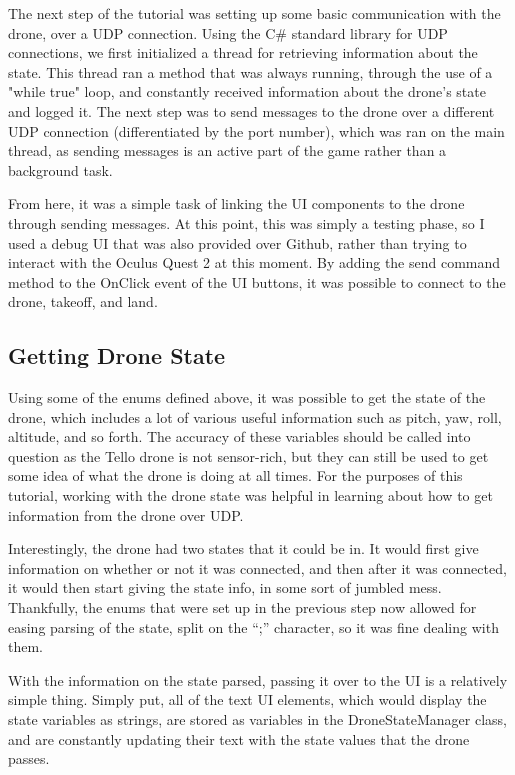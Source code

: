 \documentclass[10pt,twocolumn]{article}
\begin{document}
The next step of the tutorial was setting up some basic communication with the drone, over a UDP connection. Using the C\# standard library for UDP connections, we first initialized a thread for retrieving information about the state. This thread ran a method that was always running, through the use of a "while true" loop, and constantly received information about the drone's state and logged it. The next step was to send messages to the drone over a different UDP connection (differentiated by the port number), which was ran on the main thread, as sending messages is an active part of the game rather than a background task.

From here, it was a simple task of linking the UI components to the drone through sending messages. At this point, this was simply a testing phase, so I used a debug UI that was also provided over Github, rather than trying to interact with the Oculus Quest 2 at this moment. By adding the send command method to the OnClick event of the UI buttons, it was possible to connect to the drone, takeoff, and land.

\subsection{Getting Drone State}
Using some of the enums defined above, it was possible to get the state of the drone, which includes a lot of various useful information such as pitch, yaw, roll, altitude, and so forth. The accuracy of these variables should be called into question as the Tello drone is not sensor-rich, but they can still be used to get some idea of what the drone is doing at all times. For the purposes of this tutorial, working with the drone state was helpful in learning about how to get information from the drone over UDP. 

Interestingly, the drone had two states that it could be in. It would first give information on whether or not it was connected, and then after it was connected, it would then start giving the state info, in some sort of jumbled mess. Thankfully, the enums that were set up in the previous step now allowed for easing parsing of the state, split on the “;” character, so it was fine dealing with them.

With the information on the state parsed, passing it over to the UI is a relatively simple thing. Simply put, all of the text UI elements, which would display the state variables as strings, are stored as variables in the DroneStateManager class, and are constantly updating their text with the state values that the drone passes. 
\end{document}
